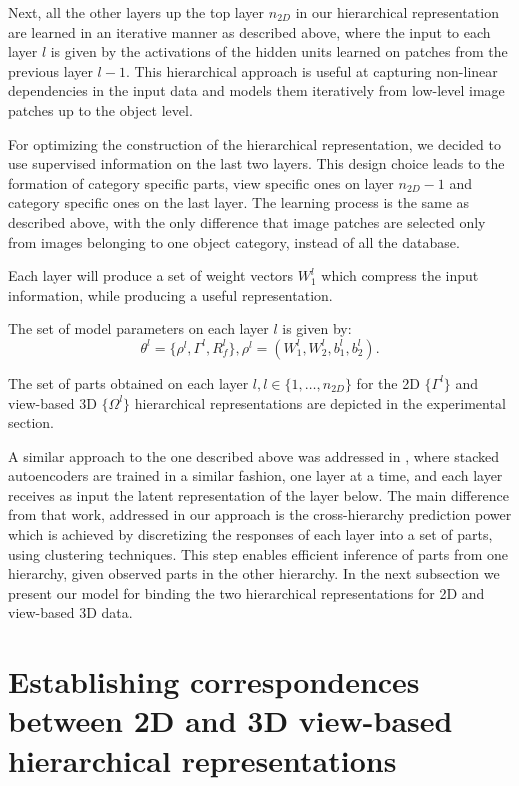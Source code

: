 \documentclass[runningheads]{llncs}
\begin{document}
Next, all the other layers up the top layer $n_{2D}$ in our hierarchical representation are learned in an iterative manner as described above, where the input to each layer $l$ is given by the activations of the hidden units learned on patches from the previous layer $l-1$. This hierarchical approach is useful at capturing non-linear dependencies in the input data and models them iteratively from low-level image patches up to the object level.

For optimizing the construction of the hierarchical representation, we decided to use supervised information on the last two layers. This design choice leads to the formation of category specific parts, view specific ones on layer $n_{2D}-1$ and category specific ones on the last layer. The learning process is the same as described above, with the only difference that image patches are selected only from images belonging to one object category, instead of all the database.    

Each layer will produce a set of weight vectors $W_1^l$ which compress the input information, while producing a useful representation. 

The set of model parameters on each layer $l$ is  given by:
\begin{equation}
\theta^l = \{\rho^l,\Gamma^l,R_f^l\},
\rho^l=(W_1^l,W_2^l,b_1^l,b_2^l).
\end{equation}

The set of parts obtained on each layer $l,l\in\{1,\ldots,n_{2D}\}$ for the 2D $\{\Gamma^l\}$ and view-based 3D $\{\Omega^l\}$ hierarchical representations are depicted in the experimental section.

A similar approach to the one described above was addressed in \cite{Masci2011}, where stacked autoencoders are trained in a similar fashion, one layer at a time, and each layer receives as input the latent representation of the layer below. The main difference from that work, addressed in our approach is the cross-hierarchy prediction power which is achieved by discretizing the responses of each layer into a set of parts, using clustering techniques. This step enables efficient inference of parts from one hierarchy, given observed parts in the other hierarchy. In the next subsection we present our model for binding the two hierarchical representations for 2D and view-based 3D data.
 
\section{Establishing correspondences between 2D and 3D view-based hierarchical representations}
\label{sec:analysis}
\end{document}

